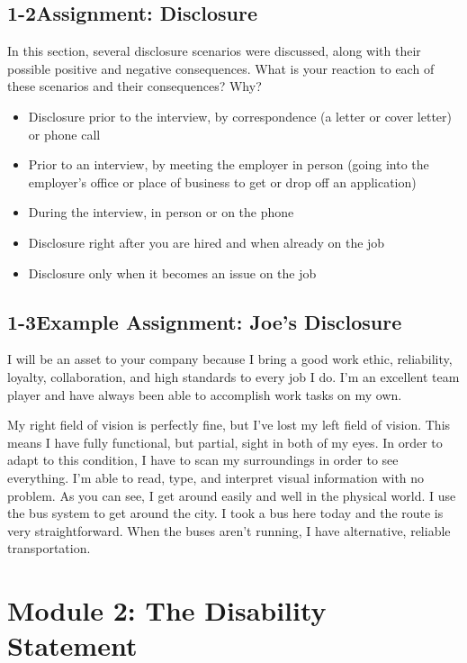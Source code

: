 \pagebreak \subsection*{1-2\quad Assignment: Disclosure}
In this section, several disclosure scenarios were discussed, along with their possible positive and negative consequences. What is your reaction to each of these scenarios and their consequences? Why?
\begin{itemize}[leftmargin=1.0cm]
	\item Disclosure prior to the interview, by correspondence (a letter or cover letter) or phone call
	\item Prior to an interview, by meeting the employer in person (going into the employer's office or place of business to get or drop off an application)
	\item During the interview, in person or on the phone
	\item Disclosure right after you are hired and when already on the job
	\item Disclosure only when it becomes an issue on the job
\end{itemize}
\pagebreak \subsection*{1-3\quad Example Assignment: Joe's Disclosure}
I will be an asset to your company because I bring a good work ethic, reliability, loyalty, collaboration, and high standards to every job I do. I'm an excellent team player and have always been able to accomplish work tasks on my own.

My right field of vision is perfectly fine, but I've lost my left field of vision. This means I have fully functional, but partial, sight in both of my eyes. In order to adapt to this condition, I have to scan my surroundings in order to see everything. I'm able to read, type, and interpret visual information with no problem. As you can see, I get around easily and well in the physical world. I use the bus system to get around the city. I took a bus here today and the route is very straightforward. When the buses aren't running, I have alternative, reliable transportation.

\pagebreak \section*{Module 2: The Disability Statement}
\noindent\makebox[\textwidth]{\rule{\linewidth}{0.4pt}}  \localtableofcontents
\noindent\makebox[\textwidth]{\rule{\linewidth}{0.4pt}}


